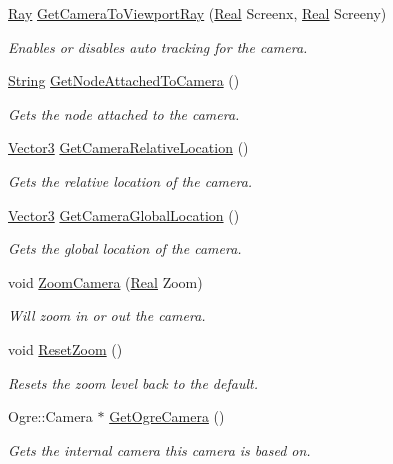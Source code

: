 \begin{DoxyCompactItemize}
\hyperlink{classphys_1_1Ray}{Ray} \hyperlink{classphys_1_1Camera_a47c437c8755301512c2757f879e03e73}{GetCameraToViewportRay} (\hyperlink{namespacephys_af7eb897198d265b8e868f45240230d5f}{Real} Screenx, \hyperlink{namespacephys_af7eb897198d265b8e868f45240230d5f}{Real} Screeny)
\begin{DoxyCompactList}\small\item\em Enables or disables auto tracking for the camera. \item\end{DoxyCompactList}\item 
\hyperlink{namespacephys_aa03900411993de7fbfec4789bc1d392e}{String} \hyperlink{classphys_1_1Camera_ab32a8c708e5e22f65dde9ab821ea20fc}{GetNodeAttachedToCamera} ()
\begin{DoxyCompactList}\small\item\em Gets the node attached to the camera. \item\end{DoxyCompactList}\item 
\hyperlink{classphys_1_1Vector3}{Vector3} \hyperlink{classphys_1_1Camera_a771fc7005191c3f83ac1fedb09699943}{GetCameraRelativeLocation} ()
\begin{DoxyCompactList}\small\item\em Gets the relative location of the camera. \item\end{DoxyCompactList}\item 
\hyperlink{classphys_1_1Vector3}{Vector3} \hyperlink{classphys_1_1Camera_a53b61b6c163270ffb4f46eb66a973b10}{GetCameraGlobalLocation} ()
\begin{DoxyCompactList}\small\item\em Gets the global location of the camera. \item\end{DoxyCompactList}\item 
void \hyperlink{classphys_1_1Camera_a1cb593d12be4e6e1e51cb8f74ce2d97c}{ZoomCamera} (\hyperlink{namespacephys_af7eb897198d265b8e868f45240230d5f}{Real} Zoom)
\begin{DoxyCompactList}\small\item\em Will zoom in or out the camera. \item\end{DoxyCompactList}\item 
void \hyperlink{classphys_1_1Camera_a181465e6add36c07a63fdd26aee7c69a}{ResetZoom} ()
\begin{DoxyCompactList}\small\item\em Resets the zoom level back to the default. \item\end{DoxyCompactList}\item 
Ogre::Camera $\ast$ \hyperlink{classphys_1_1Camera_a48c1fb8e83f3d81d40ce04d2de2fd7eb}{GetOgreCamera} ()
\begin{DoxyCompactList}\small\item\em Gets the internal camera this camera is based on. \item\end{DoxyCompactList}\end{DoxyCompactItemize}
